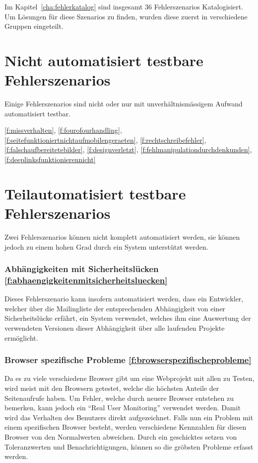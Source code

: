 Im Kapitel~\ref{cha:fehlerkatalog} sind insgesamt 36 Fehlerszenarios Katalogisiert. Um Lösungen für diese Szenarios zu finden, wurden diese zuerst in verschiedene Gruppen eingeteilt.

\section{Nicht automatisiert testbare Fehlerszenarios}
\label{sec:nicht_automatisiert_testbare_fehlerszenarios}
Einige Fehlerszenarios sind nicht oder nur mit unverhältnismässigem Aufwand automatisiert testbar.

\ref{f:missverhalten}, \ref{f:fourofourhandling}, \ref{f:seitefunktioniertnichtaufmobilengeraeten}, \ref{f:rechtschreibefehler}, \ref{f:falschaufbereitetebilder}, \ref{f:designverletzt}, \ref{f:fehlmanipulationdurchdenkunden}, \ref{f:deeplinksfunktionierennicht}

\section{Teilautomatisiert testbare Fehlerszenarios}
\label{sec:teilautomatisiert_testbare_fehlerszenarios}
Zwei Fehlerszenarios können nicht komplett automatisiert werden, sie können jedoch zu einem hohen Grad durch ein System unterstützt werden.

\subsubsection{Abhängigkeiten mit Sicherheitslücken \ref{f:abhaengigkeitenmitsicherheitsluecken}}
\label{ssub:kat_abhaengigkeitenmitsicherheitsluecken}
Dieses Fehlerszenario kann insofern automatisiert werden, dass ein Entwickler, welcher über die Mailingliste der entsprechenden Abhängigkeit von einer Sicherheitslücke erfährt, ein System verwendet, welches ihm eine Auswertung der verwendeten Versionen dieser Abhängigkeit über alle laufenden Projekte ermöglicht.

\subsubsection{Browser spezifische Probleme \ref{f:browserspezifischeprobleme}}
\label{ssub:kat_browser_spezifische_probleme}
Da es zu viele verschiedene Browser gibt um eine Webprojekt mit allen zu Testen, wird meist mit den Browsern getestet, welche die höchsten Anteile der Seitenaufrufe haben. Um Fehler, welche durch neuere Browser entstehen zu bemerken, kann jedoch ein ``Real User Monitoring'' verwendet werden. Damit wird das Verhalten des Benutzers direkt aufgezeichnet. Falls nun ein Problem mit einem spezifischen Browser besteht, werden verschiedene Kennzahlen für diesen Browser von den Normalwerten abweichen. Durch ein geschicktes setzen von Toleranzwerten und Benachrichtigungen, können so die gröbsten Probleme erfasst werden.

